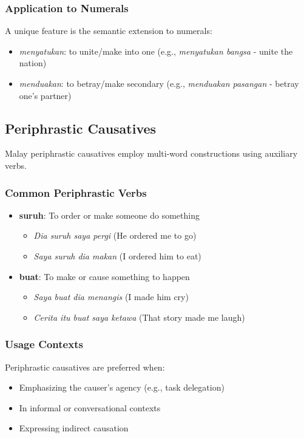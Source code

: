 \documentclass[12pt,a4paper]{article}
\begin{document}
\subsubsection{Application to Numerals}
A unique feature is the semantic extension to numerals:
\begin{itemize}
\item \textit{menyatukan}: to unite/make into one (e.g., \textit{menyatukan bangsa} - unite the nation)
\item \textit{menduakan}: to betray/make secondary (e.g., \textit{menduakan pasangan} - betray one's partner)
\end{itemize}

\subsection{Periphrastic Causatives}

Malay periphrastic causatives employ multi-word constructions using auxiliary verbs.

\subsubsection{Common Periphrastic Verbs}

\begin{itemize}
\item \textbf{suruh}: To order or make someone do something
  \begin{itemize}
  \item \textit{Dia suruh saya pergi} (He ordered me to go)
  \item \textit{Saya suruh dia makan} (I ordered him to eat)
  \end{itemize}
  
\item \textbf{buat}: To make or cause something to happen
  \begin{itemize}
  \item \textit{Saya buat dia menangis} (I made him cry)
  \item \textit{Cerita itu buat saya ketawa} (That story made me laugh)
  \end{itemize}
\end{itemize}

\subsubsection{Usage Contexts}
Periphrastic causatives are preferred when:
\begin{itemize}
\item Emphasizing the causer's agency (e.g., task delegation)
\item In informal or conversational contexts
\item Expressing indirect causation
\end{itemize}
\end{document}
